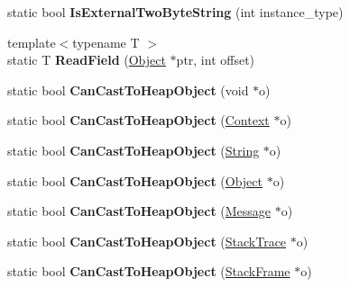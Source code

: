 \begin{DoxyCompactItemize}
\item 
\hypertarget{classv8_1_1internal_1_1_internals_a072f010fdf69ea2c0d7145190221410f}{}static bool {\bfseries Is\+External\+Two\+Byte\+String} (int instance\+\_\+type)\label{classv8_1_1internal_1_1_internals_a072f010fdf69ea2c0d7145190221410f}

\item 
\hypertarget{classv8_1_1internal_1_1_internals_a457c0c73d5fdf4cc577133edce0ce37b}{}{\footnotesize template$<$typename T $>$ }\\static T {\bfseries Read\+Field} (\hyperlink{classv8_1_1_object}{Object} $\ast$ptr, int offset)\label{classv8_1_1internal_1_1_internals_a457c0c73d5fdf4cc577133edce0ce37b}

\item 
\hypertarget{classv8_1_1internal_1_1_internals_aba843dd4a6fc9cd583ade29cd984add2}{}static bool {\bfseries Can\+Cast\+To\+Heap\+Object} (void $\ast$o)\label{classv8_1_1internal_1_1_internals_aba843dd4a6fc9cd583ade29cd984add2}

\item 
\hypertarget{classv8_1_1internal_1_1_internals_aa97cc39f251e154856d781c354c868b3}{}static bool {\bfseries Can\+Cast\+To\+Heap\+Object} (\hyperlink{classv8_1_1_context}{Context} $\ast$o)\label{classv8_1_1internal_1_1_internals_aa97cc39f251e154856d781c354c868b3}

\item 
\hypertarget{classv8_1_1internal_1_1_internals_a577fa1ecdf1eed1e3e26fe116ca0bc7e}{}static bool {\bfseries Can\+Cast\+To\+Heap\+Object} (\hyperlink{classv8_1_1_string}{String} $\ast$o)\label{classv8_1_1internal_1_1_internals_a577fa1ecdf1eed1e3e26fe116ca0bc7e}

\item 
\hypertarget{classv8_1_1internal_1_1_internals_a59b5b968c1854266b2375cc9f1fa065a}{}static bool {\bfseries Can\+Cast\+To\+Heap\+Object} (\hyperlink{classv8_1_1_object}{Object} $\ast$o)\label{classv8_1_1internal_1_1_internals_a59b5b968c1854266b2375cc9f1fa065a}

\item 
\hypertarget{classv8_1_1internal_1_1_internals_af1814bfd7589cb1c63d4a3837c31e086}{}static bool {\bfseries Can\+Cast\+To\+Heap\+Object} (\hyperlink{classv8_1_1_message}{Message} $\ast$o)\label{classv8_1_1internal_1_1_internals_af1814bfd7589cb1c63d4a3837c31e086}

\item 
\hypertarget{classv8_1_1internal_1_1_internals_adc502cf5ff5fc2dd313bea0d2ec2c0d6}{}static bool {\bfseries Can\+Cast\+To\+Heap\+Object} (\hyperlink{classv8_1_1_stack_trace}{Stack\+Trace} $\ast$o)\label{classv8_1_1internal_1_1_internals_adc502cf5ff5fc2dd313bea0d2ec2c0d6}

\item 
\hypertarget{classv8_1_1internal_1_1_internals_a04a5b91800d93c062f0841479538bb06}{}static bool {\bfseries Can\+Cast\+To\+Heap\+Object} (\hyperlink{classv8_1_1_stack_frame}{Stack\+Frame} $\ast$o)\label{classv8_1_1internal_1_1_internals_a04a5b91800d93c062f0841479538bb06}

\end{DoxyCompactItemize}
